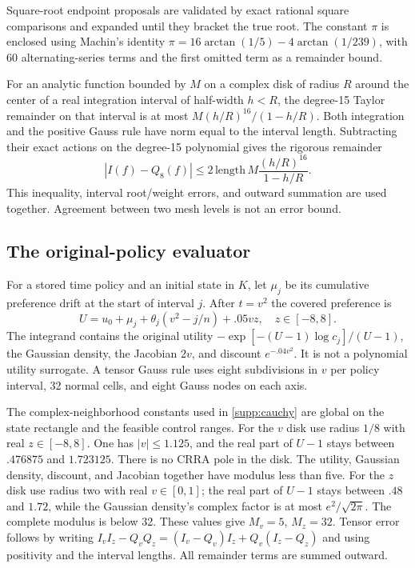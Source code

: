Square-root endpoint proposals are validated by exact rational square comparisons and expanded until they bracket the true root. The constant $\pi$ is enclosed using Machin's identity
$\pi=16\arctan(1/5)-4\arctan(1/239)$, with 60 alternating-series terms and the first omitted term as a remainder bound.

For an analytic function bounded by $M$ on a complex disk of radius $R$ around the center of a real integration interval of half-width $h<R$, the degree-15 Taylor remainder on that interval is at most
$M(h/R)^{16}/(1-h/R)$.
Both integration and the positive Gauss rule have norm equal to the interval length. Subtracting their exact actions on the degree-15 polynomial gives the rigorous remainder
\begin{equation}
 |I(f)-Q_8(f)|\leq
 2\,\mathrm{length}\,M\frac{(h/R)^{16}}{1-h/R}.
 \label{supp:cauchy}
\end{equation}
This inequality, interval root/weight errors, and outward summation are used together. Agreement between two mesh levels is not an error bound.

\subsection{The original-policy evaluator}
For a stored time policy and an initial state in $K$, let $\mu_j$ be its cumulative preference drift at the start of interval $j$. After $t=v^2$ the covered preference is
\[
 U= u_0+\mu_j+\theta_j(v^2-j/n)+.05vz,\quad z\in[-8,8].
\]
The integrand contains the original utility $-\exp[-(U-1)\log c_j]/(U-1)$, the Gaussian density, the Jacobian $2v$, and discount $e^{-.04v^2}$. It is not a polynomial utility surrogate. A tensor Gauss rule uses eight subdivisions in $v$ per policy interval, 32 normal cells, and eight Gauss nodes on each axis.

The complex-neighborhood constants used in \eqref{supp:cauchy} are global on the state rectangle and the feasible control ranges. For the $v$ disk use radius $1/8$ with real $z\in[-8,8]$. One has $|v|\leq1.125$, and the real part of $U-1$ stays between $.476875$ and $1.723125$. There is no CRRA pole in the disk. The utility, Gaussian density, discount, and Jacobian together have modulus less than five. For the $z$ disk use radius two with real $v\in[0,1]$; the real part of $U-1$ stays between $.48$ and $1.72$, while the Gaussian density's complex factor is at most $e^2/\sqrt{2\pi}$. The complete modulus is below 32. These values give $M_v=5$, $M_z=32$. Tensor error follows by writing $I_vI_z-Q_vQ_z=(I_v-Q_v)I_z+Q_v(I_z-Q_z)$ and using positivity and the interval lengths. All remainder terms are summed outward.

